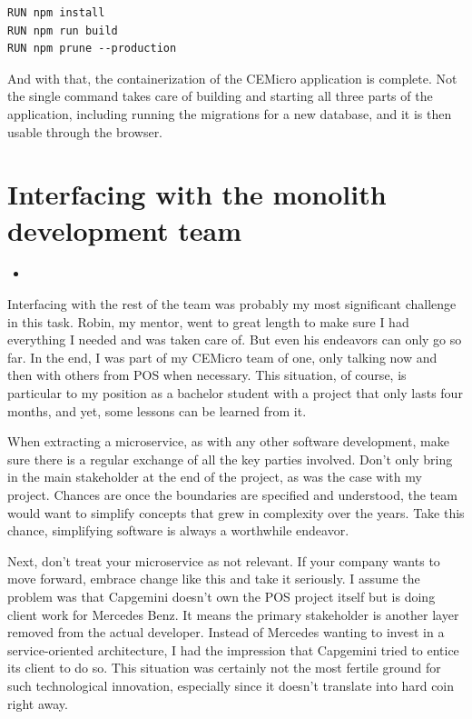 \begin{lstlisting}
RUN npm install
RUN npm run build
RUN npm prune --production
\end{lstlisting}

And with that, the containerization of the CEMicro application is complete. Not the single command  takes care of building and starting all three parts of the application, including running the migrations for a new database, and it is then usable through the browser.


\section{Interfacing with the monolith development team}

\begin{itemize}
  \item {}
\end{itemize}

Interfacing with the rest of the team was probably my most significant challenge in this task. Robin, my mentor, went to great length to make sure I had everything I needed and was taken care of. But even his endeavors can only go so far. In the end, I was part of my CEMicro team of one, only talking now and then with others from POS when necessary. This situation, of course, is particular to my position as a bachelor student with a project that only lasts four months, and yet, some lessons can be learned from it.

When extracting a microservice, as with any other software development, make sure there is a regular exchange of all the key parties involved. Don't only bring in the main stakeholder at the end of the project, as was the case with my project. Chances are once the boundaries are specified and understood, the team would want to simplify concepts that grew in complexity over the years. Take this chance, simplifying software is always a worthwhile endeavor.

Next, don't treat your microservice as not relevant. If your company wants to move forward, embrace change like this and take it seriously. I assume the problem was that Capgemini doesn't own the POS project itself but is doing client work for Mercedes Benz. It means the primary stakeholder is another layer removed from the actual developer. Instead of Mercedes wanting to invest in a service-oriented architecture, I had the impression that Capgemini tried to entice its client to do so. This situation was certainly not the most fertile ground for such technological innovation, especially since it doesn't translate into hard coin right away.

